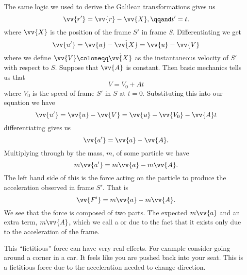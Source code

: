     The same logic we used to derive the Galilean transformations gives us
    \begin{equation}
        \vv{r'} = \vv{r} - \vv{X}, \qqand t' = t.
    \end{equation}
    where \(\vv{X}\) is the position of the frame \(S'\) in frame \(S\).
    Differentiating we get
    \begin{equation}
        \vv{u'} = \vv{u} - \dot{\vv{X}} = \vv{u} - \vv{V}
    \end{equation}
    where we define \(\vv{V} \coloneqq \dot{\vv{X}}\) as the instantaneous velocity of \(S'\) with respect to \(S\).
    Suppose that \(\vv{A}\) is constant.
    Then basic mechanics tells us that
    \begin{equation}
        V = V_0 + At
    \end{equation}
    where \(V_0\) is the speed of frame \(S'\) in \(S\) at \(t = 0\).
    Substituting this into our equation we have
    \begin{equation}
        \vv{u'} = \vv{u} - \vv{V} = \vv{u} - \vv{V_0} - \vv{A}t
    \end{equation}
    differentiating gives us
    \begin{equation}
        \vv{a'} = \vv{a} - \vv{A}.
    \end{equation}
    Multiplying through by the mass, \(m\), of some particle we have
    \begin{equation}
        m\vv{a'} = m\vv{a} - m\vv{A}.
    \end{equation}
    The left hand side of this is the force acting on the particle to produce the acceleration observed in frame \(S'\).
    That is
    \begin{equation}
        \vv{F'} = m\vv{a} - m\vv{A}.
    \end{equation}
    We see that the force is composed of two parts.
    The expected \(m\vv{a}\) and an extra term, \(m\vv{A}\), which we call a  or  due to the fact that it exists only due to the acceleration of the frame.
    
    This \enquote{fictitious} force can have very real effects.
    For example consider going around a corner in a car.
    It feels like you are pushed back into your seat.
    This is a fictitious force due to the acceleration needed to change direction.
    
